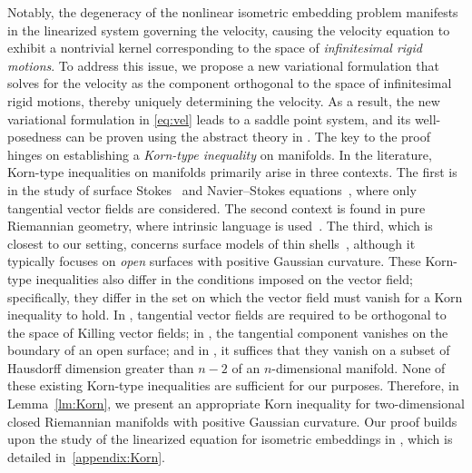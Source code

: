 \documentclass[11pt,a4paper,oneside,reqno]{amsart}
\theoremstyle{definition}
\theoremstyle{plain}
\numberwithin{theorem}{section}
\numberwithin{proposition}{section}
\numberwithin{lemma}{section}
\numberwithin{equation}{section}
\newcommand{\GZ}[1]{{[\color{magenta}GZ:~#1}]}
\begin{document}

Notably, the degeneracy of the nonlinear isometric embedding problem manifests in the linearized system governing the velocity, causing the velocity equation to exhibit a nontrivial kernel corresponding to the space of \emph{infinitesimal rigid motions}. To address this issue, we propose a new variational formulation that solves for the velocity as the component orthogonal to the space of {infinitesimal rigid motions}, thereby uniquely determining the velocity. 
As a result, the new variational formulation in \eqref{eq:vel} leads to a saddle point system, and its well-posedness can be proven using the abstract theory in \cite{boffi2013mixed}. The key to the proof hinges on establishing a \emph{Korn-type inequality} on manifolds. In the literature, Korn-type inequalities on manifolds primarily arise in three contexts.
The first is in the study of surface Stokes~\cite{bonito2020divergence} and Navier--Stokes equations~\cite{jankuhn2018incompressible}, where only tangential vector fields are considered. The second context is found in pure Riemannian geometry, where intrinsic language is used~\cite{chen2002riemannian, duduchava2010lions}. The third, which is closest to our setting, concerns surface models of thin shells~\cite{ciarlet2016korn}, although it typically focuses on \emph{open} surfaces with positive Gaussian curvature.
These Korn-type inequalities also differ in the conditions imposed on the vector field; specifically, they differ in the set on which the vector field must vanish for a Korn inequality to hold.
In \cite{jankuhn2018incompressible, bonito2020divergence}, tangential vector fields are required to be orthogonal to the space of Killing vector fields; in \cite{ciarlet2016korn}, the tangential component vanishes on the boundary of an open surface; and in \cite{chen2002riemannian}, it suffices that they vanish on a subset of Hausdorff dimension greater than \(n-2\) of an \(n\)-dimensional manifold. 
None of these existing Korn-type inequalities are sufficient for our purposes. Therefore, in Lemma~\ref{lm:Korn}, we present an appropriate Korn inequality for two-dimensional closed Riemannian manifolds with positive Gaussian curvature. Our proof builds upon the study of the linearized equation for isometric embeddings in \cite[Lemma 9.2.2]{han2006isometric}, which is detailed in~\ref{appendix:Korn}.
\end{document}
